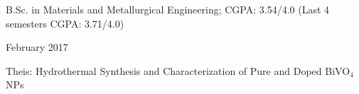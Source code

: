\documentclass[a4paper,20pt]{article}
\begin{document}
   		\begin{minipage}{.85\linewidth} \begin{flushleft}
    		B.Sc. in Materials and Metallurgical Engineering;  CGPA: 3.54/4.0 (Last 4 semesters CGPA: 3.71/4.0)\\
    	\end{flushleft} \end{minipage}
    \hfill 
    \begin{minipage}{.13\linewidth}\begin{flushright}
    	 February 2017
    	\end{flushright}\end{minipage}
	 Theis: Hydrothermal Synthesis and Characterization of Pure and Doped BiVO$_{4}$ NPs\\
	 \vspace{2pt}
	  

    	
\end{document}
